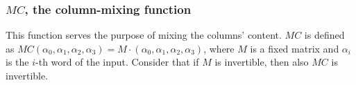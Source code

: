 \subsubsection{$MC$, the column-mixing function}
This function serves the purpose of mixing the columns' content.\newline
$MC$ is defined as $MC(\alpha_{0}, \alpha_{1}, \alpha_{2}, \alpha_{3}) = M \cdot (\alpha_{0}, \alpha_{1}, \alpha_{2}, \alpha_{3})$, where $M$ is a fixed matrix and $\alpha_{i}$ is the $i$-th word of the input.
Consider that if $M$ is invertible, then also $MC$ is invertible.
